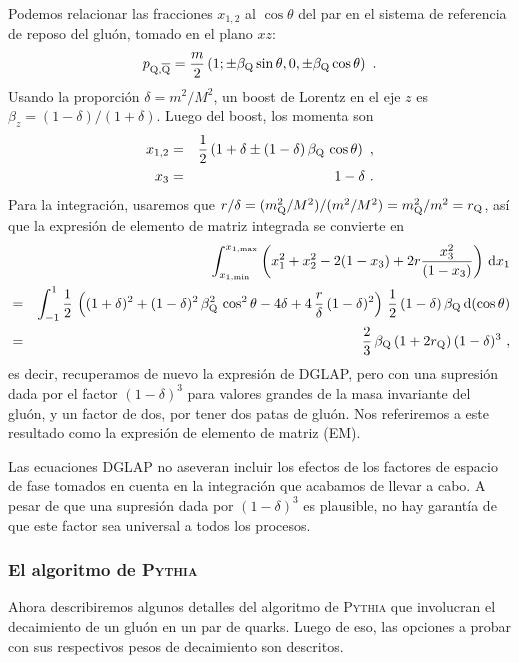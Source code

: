 \documentclass[a4paper,12pt]{article}
\begin{document}
Podemos relacionar las fracciones $x_{1,2}$ al $\cos\theta$ del par en el sistema de referencia de reposo del gluón, tomado en el plano $xz$:
\begin{equation}
p_{{\mathrm Q},\overline{\mathrm Q}} = \frac{m}{2} \left( 1; \pm \beta_{{\mathrm Q}} \sin\theta, 0, 
 \pm \beta_{{\mathrm Q}} \cos\theta \right) ~.
\label{kinp}
\end{equation}
Usando la proporción $\delta=m^2/M^2$, un boost de Lorentz en el eje $z$ es $\beta_z=(1-\delta)/(1+\delta)$. Luego del boost, los momenta son
\begin{eqnarray}
x_{1,2} & = & \frac{1}{2} \left(1 + \delta \pm (1 - \delta)
\, \beta_{{\mathrm Q}} \, \cos\theta \right) ~, \label{kinx} \\
x_3 & = & 1 - \delta ~.
\end{eqnarray}
Para la integración, usaremos que $r/\delta=(m_{\mathrm Q}^2/M^2)/(m^2/M^2)=m_{\mathrm Q}^2/m^2=r_{\mathrm Q}$, así que la expresión de elemento de matriz integrada se convierte en
\begin{eqnarray}
 &  & \int_{x_{1,\mathrm{min}}}^{x_{1,\mathrm{max}}} \left( x_1^2 + x_2^2 - 2(1 - x_3) 
+ 2r \frac{x_3^2}{(1 - x_3)} \right)  \, {\mathrm d} x_1 \nonumber \\
& = & \int_{-1}^1 \frac{1}{2} \, \left( (1 + \delta)^2 
+ (1 - \delta)^2 \, \beta_{{\mathrm Q}}^2 \, \cos^2\theta - 4 \delta 
+ 4 \, \frac{r}{\delta} \, (1 - \delta)^2 \right) \, \frac{1}{2} 
\, (1 - \delta) \, \beta_{{\mathrm Q}} \, {\mathrm d}(\cos\theta) \nonumber \\
& = & \frac{2}{3} \, \beta_{{\mathrm Q}} \, (1 + 2 r_{{\mathrm Q}}) \, (1 - \delta)^3 ~, 
\label{m2ME} 
\end{eqnarray}
es decir, recuperamos de nuevo la expresión de DGLAP, pero con una supresión dada por el factor $(1-\delta)^3$ para valores grandes de la masa invariante del gluón, y un factor de dos, por tener dos patas de gluón. Nos referiremos a este resultado como la expresión de elemento de matriz (EM).

Las ecuaciones DGLAP no aseveran incluir los efectos de los factores de espacio de fase tomados en cuenta en la integración que acabamos de llevar a cabo. A pesar de que una supresión dada por $(1-\delta)^3$ es plausible, no hay garantía de que este factor sea universal a todos los procesos.

\subsubsection{El algoritmo de \textsc{Pythia}}
\label{subsubsec:PythiaAlg}

Ahora describiremos algunos detalles del algoritmo de \textsc{Pythia} que involucran el decaimiento de un gluón en un par de quarks. Luego de eso, las opciones a probar con sus respectivos pesos de decaimiento son descritos.
\end{document}
